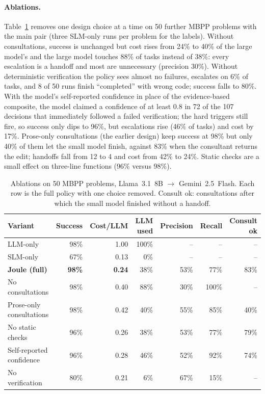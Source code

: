 \paragraph{Ablations.}
Table~\ref{tab:ablations} removes one design choice at a time on 50 further MBPP problems with the main pair (three SLM-only runs per problem for the labels).
Without consultations, success is unchanged but cost rises from 24\% to 40\% of the large model's and the large model touches 88\% of tasks instead of 38\%: every escalation is a handoff and most are unnecessary (precision 30\%).
Without deterministic verification the policy sees almost no failures, escalates on 6\% of tasks, and 8 of 50 runs finish ``completed'' with wrong code; success falls to 80\%.
With the model's self-reported confidence in place of the evidence-based composite, the model claimed a confidence of at least 0.8 in 72 of the 107 decisions that immediately followed a failed verification; the hard triggers still fire, so success only dips to 96\%, but escalations rise (46\% of tasks) and cost by 17\%.
Prose-only consultations (the earlier design) keep success at 98\% but only 40\% of them let the small model finish, against 83\% when the consultant returns the edit; handoffs fall from 12 to 4 and cost from 42\% to 24\%.
Static checks are a small effect on three-line functions (96\% versus 98\%).

\begin{table}[t]
\centering
\small
\caption{Ablations on 50 MBPP problems, Llama~3.1~8B $\rightarrow$ Gemini~2.5~Flash. Each row is the full policy with one choice removed. Consult ok: consultations after which the small model finished without a handoff.}
\label{tab:ablations}
\begin{tabular}{lrrrrrr}
\toprule
Variant & Success & Cost/LLM & LLM used & Precision & Recall & Consult ok \\
\midrule
LLM-only & 98\% & 1.00 & 100\% & -- & -- & -- \\
SLM-only & 67\% & 0.13 & 0\% & -- & -- & -- \\
\textbf{Joule (full)} & \textbf{98\%} & \textbf{0.24} & 38\% & 53\% & 77\% & 83\% \\
No consultations & 98\% & 0.40 & 88\% & 30\% & 100\% & -- \\
Prose-only consultations & 98\% & 0.42 & 40\% & 55\% & 85\% & 40\% \\
No static checks & 96\% & 0.26 & 38\% & 53\% & 77\% & 79\% \\
Self-reported confidence & 96\% & 0.28 & 46\% & 52\% & 92\% & 74\% \\
No verification & 80\% & 0.21 & 6\% & 67\% & 15\% & -- \\
\bottomrule
\end{tabular}
\end{table}


